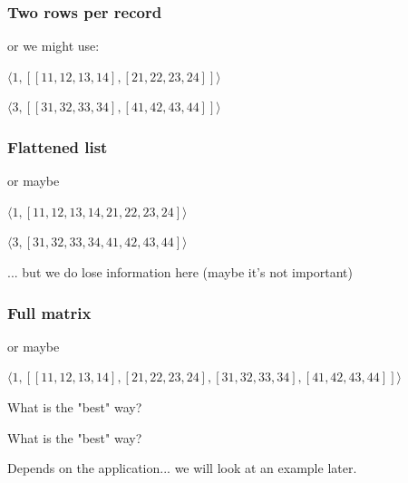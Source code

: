 \documentclass{beamer}
\begin{document}
\begin{frame}
\frametitle{Two rows per record}

or we might use:

\begin{center}

$\langle 1, [ [11,  12, 13, 14], [21, 22, 23, 24] ] \rangle$

\vspace{0.1in}

$\langle 3, [[31, 32, 33, 34],[41, 42, 43, 44]] \rangle$

\end{center}

\end{frame}



\begin{frame}
\frametitle{Flattened list}

or maybe 

\begin{center}

$\langle 1, [11,  12, 13, 14, 21, 22, 23, 24 ] \rangle$

\vspace{0.1in}

$\langle 3, [31, 32, 33, 34, 41, 42, 43, 44] \rangle$

\end{center}

\vspace{0.2in}

... but we do lose information here (maybe it's not important)

\end{frame}

\begin{frame}
\frametitle{Full matrix}

or maybe 

\begin{center}

$\langle 1, [ [11,  12, 13, 14], [21, 22, 23, 24], [31, 32, 33, 34],[41, 42, 43, 44] ] \rangle$

\end{center}
\end{frame}


\begin{frame}
What is the "best" way?
\end{frame}

\begin{frame}
What is the "best" way? 

\vspace{0.2in}

Depends on the application... we will look at an example later.
\end{frame}
\end{document}
